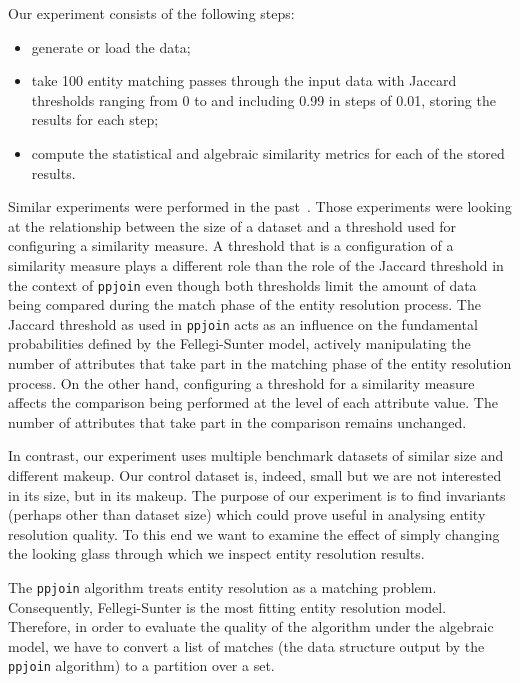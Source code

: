 Our experiment consists of the following steps:

\begin{itemize}
    \item generate or load the data;
    \item take 100 entity matching passes through the input data with
          Jaccard thresholds ranging from 0 to and including 0.99 in steps of
          0.01, storing the results for each step;
    \item compute the statistical and algebraic similarity metrics for each
          of the stored results.
\end{itemize}

Similar experiments were performed in the past~\cite{draisbach2013choosing}.
Those experiments were looking at the relationship between the size of a dataset
and a threshold used for configuring a similarity measure.
A threshold that is a configuration of a similarity measure plays a different
role than the role of the Jaccard threshold in the context of \texttt{ppjoin}
even though both thresholds limit the amount of data being compared during the 
match phase of the entity resolution process.
The Jaccard threshold as used in \texttt{ppjoin} acts as an influence on the
fundamental probabilities defined by the Fellegi-Sunter model, actively
manipulating the number of attributes that take part in the matching phase of
the entity resolution process.
On the other hand, configuring a threshold for a similarity measure affects the
comparison being performed at the level of each attribute value.
The number of attributes that take part in the comparison remains unchanged.

In contrast, our experiment uses multiple benchmark datasets of similar size and
different makeup.
Our control dataset is, indeed, small but we are not interested in its size, but
in its makeup.
The purpose of our experiment is to find invariants (perhaps other than dataset
size) which could prove useful in analysing entity resolution quality.
To this end we want to examine the effect of simply changing the looking glass
through which we inspect entity resolution results.

The \texttt{ppjoin} algorithm treats entity resolution as a matching problem.
Consequently, Fellegi-Sunter is the most fitting entity resolution model.
Therefore, in order to evaluate the quality of the algorithm under the algebraic
model, we have to convert a list of matches (the data structure output by the
 \texttt{ppjoin} algorithm) to a partition over a set.

